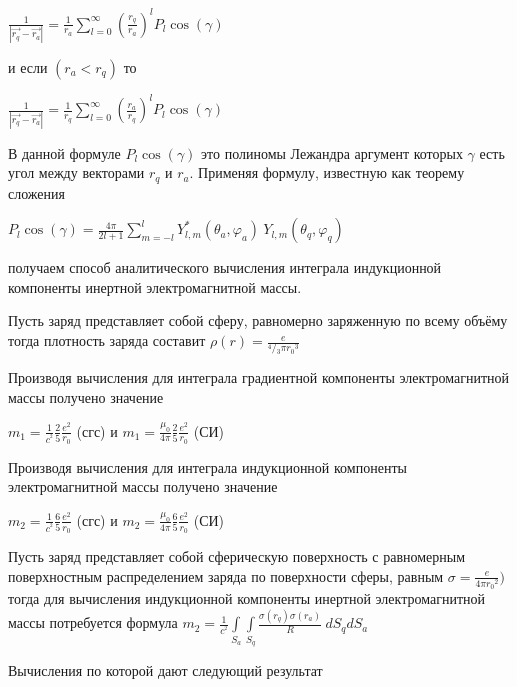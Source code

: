 \documentclass{article}
\begin{document}
$\frac{1}{\left| \overrightarrow{{{r}_{q}}}-\overrightarrow{{{r}_{a}}} \right|}=\frac{1}{{{r}_{a}}}\sum\limits_{l=0}^{\infty }{{{\left( \frac{{{r}_{q}}}{{{r}_{a}}} \right)}^{l}}{{P}_{l}} \cos \left( \gamma  \right)}$

и если $\left( {{r}_{a}}<{{r}_{q}} \right)$ то

$\frac{1}{\left| \overrightarrow{{{r}_{q}}}-\overrightarrow{{{r}_{a}}} \right|}=\frac{1}{{{r}_{q}}}\sum\limits_{l=0}^{\infty }{{{\left( \frac{{{r}_{a}}}{{{r}_{q}}} \right)}^{l}}{{P}_{l}} \cos \left( \gamma  \right)}$

В данной формуле ${{P}_{l}} \cos \left( \gamma  \right)$ это полиномы Лежандра аргумент которых $\gamma$ есть угол между векторами ${{r}_{q}}$  и ${{r}_{a}}$. Применяя формулу, известную как теорему сложения

${{P}_{l}}\cos \left( \gamma  \right)=\frac{4\pi }{2l+1}\sum\limits_{m=-l}^{l}{Y_{l,m}^{*}\left( {{\theta }_{a}},{{\varphi }_{a}} \right)}\ {{Y}_{l,m}}\left( {{\theta }_{q}},{{\varphi }_{q}} \right)$

получаем способ аналитического вычисления интеграла индукционной компоненты инертной электромагнитной массы.

Пусть заряд представляет собой сферу, равномерно заряженную по всему объёму тогда плотность заряда составит $\rho \left( r \right)=\frac{e}{{}^{4}/{}_{3}\pi {{r}_{0}}^{3}}$

Производя вычисления для интеграла градиентной компоненты электромагнитной массы получено значение

$m_1 =\frac{1}{{{c}^{^{2}}}}\frac{2}{5}\frac{e^2}{{{r}_{0}}}$ (сгс) и
$m_1 =\frac{{{\mu }_{0}}}{4\pi }\frac{2}{5}\frac{e^2}{{{r}_{0}}}$ (СИ)

Производя вычисления для интеграла индукционной компоненты электромагнитной массы получено значение

$m_2 =\frac{1}{{{c}^{^{2}}}}\frac{6}{5}\frac{e^2}{{{r}_{0}}}$ (сгс) и
$m_2 =\frac{{{\mu }_{0}}}{4\pi }\frac{6}{5}\frac{e^2}{{{r}_{0}}}$ (СИ)

Пусть заряд представляет собой сферическую поверхность с равномерным поверхностным распределением заряда по поверхности сферы, равным $\sigma=\frac{e}{4\pi {{r}_{0}}^{2}})$ тогда для вычисления индукционной компоненты инертной электромагнитной массы потребуется формула
$m_2=\frac{1}{{{c}^{^{2}}}}\int\limits_{{{S}_{a}}}{\int\limits_{{{S}_{q}}}{\frac{\sigma \left( {{r}_{q}} \right)\sigma \left( {{r}_{a}} \right)}{R}}}\ d{{S}_{q}}d{{S}_{a}}$

Вычисления по которой дают следующий результат
\end{document}
